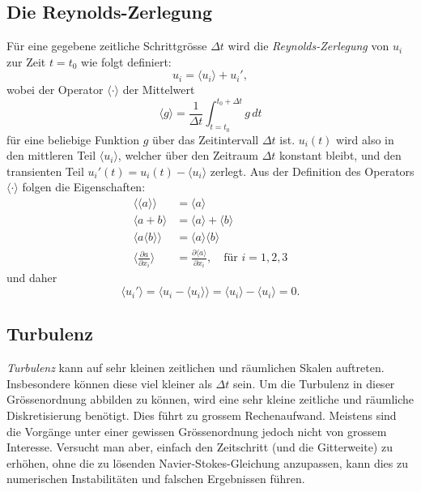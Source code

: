 \subsection{Die Reynolds-Zerlegung}
%
Für eine gegebene zeitliche Schrittgrösse $\Delta t$ wird die \emph{Reynolds-Zerlegung} von $u_i$ zur Zeit $t = t_0$
%
wie folgt definiert:
%
\newcommand{\ravg}[1]{\ensuremath{\langle #1 \rangle}}
\newcommand{\rdecomp}[1]{\ensuremath{\ravg{#1} + #1'}}
%
\begin{equation}
    \label{reynolds:eqs:reynolds-decomp}
    u_i = \rdecomp{u_i},
\end{equation}
%
wobei der Operator $\ravg{\cdot}$ der Mittelwert
%
\begin{equation}
    \ravg{g} = \frac{1}{\Delta t}\int_{t=t_0}^{t_0 + \Delta t} g \,dt
\end{equation}
%
für eine beliebige Funktion $g$ über das Zeitintervall $\Delta t$ ist.
%
$u_i(t)$ wird also in den mittleren Teil $\ravg{u_i}$, welcher über den Zeitraum
$\Delta t$ konstant bleibt, und den transienten Teil $u_i'(t) = u_i(t) - \langle u_i \rangle$
zerlegt.
%
Aus der Definition des Operators $\ravg{\cdot}$ folgen die Eigenschaften:
%
\begin{align}
    \ravg{\ravg{a}} &= \ravg{a} \\
    \ravg{a + b} &= \ravg{a} + \ravg{b} \\
    \ravg{a \ravg{b}} &= \ravg{a} \ravg{b} \\
    \label{reynolds:eqs:ravg-partial}
    \biggl\langle\frac{\partial a}{\partial x_i}\biggr\rangle &=
        \frac{\partial \ravg{a}}{\partial x_i},\quad\text{für $i = 1, 2, 3$}
\end{align}
%
und daher
%
\begin{equation}
    \label{reynolds:eqs:trans-cancel}
    \ravg{u_i'} = \ravg{u_i - \ravg{u_i}} = \ravg{u_i} - \ravg{u_i} = 0.
\end{equation}
%
\subsection{Turbulenz}
%
\emph{Turbulenz} kann auf sehr kleinen zeitlichen und räumlichen Skalen auftreten.
%
%
Insbesondere können diese viel kleiner als $\Delta t$ sein. Um die Turbulenz in dieser
Grössenordnung abbilden zu können, wird eine sehr kleine zeitliche und räumliche Diskretisierung
%
benötigt. Dies führt zu grossem Rechenaufwand. Meistens sind die Vorgänge unter
einer gewissen Grössenordnung jedoch nicht von grossem Interesse. Versucht man aber, einfach den Zeitschritt
(und die Gitterweite) zu erhöhen, ohne die zu lösenden Navier-Stokes-Gleichung
anzupassen, kann dies zu numerischen Instabilitäten und falschen Ergebnissen führen.
%
